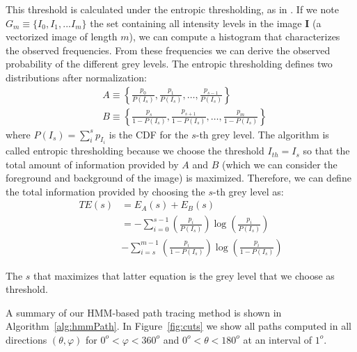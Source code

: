 This threshold is calculated under the entropic thresholding, as in \cite{Yen1995}. If we note $G_m \equiv \{I_0, I_1, ... I_m\} $ the set containing all intensity levels in the image $\mathbf{I}$ (a vectorized image of length $m$), we can compute a histogram that characterizes the observed frequencies. From these frequencies we can derive the observed probability of the different grey levels. The entropic thresholding defines two distributions after normalization: 
\begin{align}
& A \equiv \left\{\frac{p_0}{P(I_{s})}, \frac{p_1}{P(I_{s})}, \dots, \frac{p_{s-1}}{P(I_{s})} \right\}\\
& B \equiv \left\{\frac{p_{s}}{1-P(I_{s})}, \frac{p_{s+1}}{1-P(I_{s})}, \dots, \frac{p_m}{1-P(I_{s})} \right\}
\end{align}
where $P(I_s) = \sum_{i}^{s}p_{I_i}$ is the \ac{CDF} for the $s$-th grey level. The algorithm is called entropic thresholding because we choose the threshold $I_{th}=I_s$ so that the total amount of information provided by $A$ and $B$ (which we can consider the foreground and background of the image) is maximized. Therefore, we can define the total information provided by choosing the $s$-th grey level as: 
\begin{align}
TE(s) & = E_A(s) + E_B(s) \\
& = -\sum_{i=0}^{s-1}\left(\frac{p_i}{P(I_s)}\right)\log\left(\frac{p_i}{P(I_s)}\right) \\
& - \sum_{i=s}^{m-1}\left(\frac{p_i}{1-P(I_s)}\right)\log\left(\frac{p_i}{1-P(I_s)}\right)
\end{align}

The $s$ that maximizes that latter equation is the grey level that we choose as threshold. 

A summary of our \ac{HMM}-based path tracing method is shown in Algorithm~\ref{alg:hmmPath}. In Figure~\ref{fig:cuts} we show all paths computed in all directions $(\theta,\varphi)$ for $0^o<\varphi<360^o$ and $0^o<\theta<180^o$ at an interval of $1^o$. 

